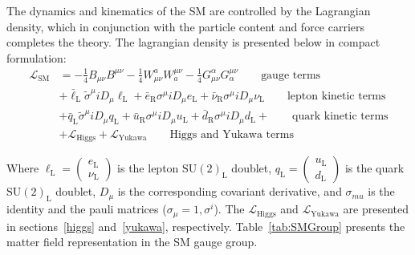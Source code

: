 The dynamics and kinematics of the SM are controlled by the
Lagrangian density, which in conjunction with the particle content and
force carriers completes the theory. The lagrangian density is
presented below in compact formulation:
\begin{equation}
 \begin{aligned}
        \mathcal{L}_{\mathrm{SM}}& = -\frac{1}{4}B_{\mu\nu}B^{\mu\nu}
        -\frac{1}{4}W^{a}_{\mu\nu}W^{\mu\nu}_{a} - \frac{1}{4}G^{\alpha}_{\mu\nu}G^{\mu\nu}_{\alpha} 
        \qquad \text{gauge terms}\\
        &+\bar{\ell}_{\mathrm{L}}\tilde{\sigma}^{\mu}iD_{\mu}\ell_{\mathrm{L}}
        +\bar{e}_{\mathrm{R}}\sigma^{\mu}iD_{\mu}e_{\mathrm{L}} +
        \bar{\nu}_{\mathrm{R}}\sigma^{\mu}iD_{\mu}\nu_{\mathrm{L}} \qquad \text{lepton kinetic terms}\\
        &+\bar{q}_{\mathrm{L}}\tilde{\sigma}^{\mu}iD_{\mu}q_{\mathrm{L}}
        +\bar{u}_{\mathrm{R}}\sigma^{\mu}iD_{\mu}u_{\mathrm{L}} +
        \bar{d}_{\mathrm{R}}\sigma^{\mu}iD_{\mu}d_{\mathrm{L}} + \qquad \text{quark kinetic terms}\\
        &+\mathcal{L}_{\mathrm{Higgs}} +
        \mathcal{L}_{\mathrm{Yukawa}}\qquad \text{Higgs and Yukawa terms}
       \end{aligned}
\label{eq:theSMlagrangian}
\end{equation}

Where $\ell_{\mathrm{L}}=\begin{pmatrix}e_{\mathrm{L}}\\
  \nu_{\mathrm{L}}\end{pmatrix}$ is the lepton $\mathrm{SU(2)_{L}}$
doublet, $q_{\mathrm{L}}=\begin{pmatrix}u_{\mathrm{L}}\\
  d_{\mathrm{L}}\end{pmatrix}$ is the quark $\mathrm{SU(2)_{L}}$
doublet, $D_{\mu}$ is the corresponding covariant derivative, and
 $\sigma_{mu}$ is the identity and the pauli matrices ($\sigma_{\mu} = {1,\sigma^{i}}$).
The $\mathcal{L}_{\mathrm{Higgs}}$ and $\mathcal{L}_{\mathrm{Yukawa}}$
are presented in sections~\ref{higgs} and~\ref{yukawa}, respectively.
Table~\ref{tab:SMGroup} presents the matter field representation in
the SM gauge group.


